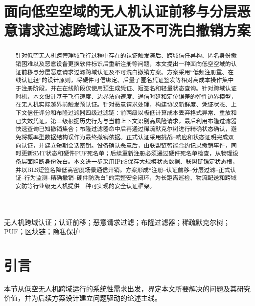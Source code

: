 \documentclass[conference]{IEEEtran}
\begin{document}
	
	\title{面向低空空域的无人机认证前移与分层恶意请求过滤跨域认证及不可洗白撤销方案}
	
	\author{
	}
	
	\maketitle
	
	\begin{abstract}
		针对低空无人机跨管理域飞行过程中存在的认证触发滞后、跨域信任异构、匿名身份撤销困难以及恶意设备更换软件标识后重新注册等问题，本文提出一种面向低空空域的认证前移与分层恶意请求过滤跨域认证及不可洗白撤销方案。方案采用“低频注册重、在线认证轻”的设计原则，将硬件可信绑定、后量子匿名凭证签发等相对高成本操作集中于注册阶段，并在在线阶段仅使用预生成凭证、短签名和轻量状态查询。针对跨域认证时机，本文设计基于飞行速度、边界法向速度、通信时延和定位误差的弹性边界模型，在无人机实际越界前触发预认证。针对恶意请求处理，构建协议新鲜度、凭证状态、上下文信任评分和布隆过滤器四级过滤链：前两级以极低计算成本丢弃格式异常、重放和已失效凭证，第三级根据历史行为与当前上下文识别高风险请求，最后利用布隆过滤器快速查询已知撤销集合；布隆过滤器命中后再通过稀疏默克尔树进行精确状态确认，避免将概率型数据结构误作为最终撤销依据。正式认证采用挑战--响应和状态证明完成双向认证，并建立短期会话密钥。设备确认恶意后，由联盟链智能合约记录撤销事件，同时更新SMT状态和硬件PUF死名单；后续重新注册必须通过硬件死名单检查，从物理设备层面阻断身份洗白。本文进一步采用IPFS保存大规模状态数据、联盟链锚定状态根，并以BLS短签名降低高密度场景通信开销。方案形成“注册--认证前移--分层过滤--正式认证--行为监测--精确撤销--硬件防洗白”的完整安全闭环，为长距离巡检、物流配送和跨域安防等行业级无人机提供一种可实现的安全认证框架。
	\end{abstract}
	
	\begin{IEEEkeywords}
		无人机跨域认证；认证前移；恶意请求过滤；布隆过滤器；稀疏默克尔树；PUF；区块链；隐私保护
	\end{IEEEkeywords}
	
	\section{引言}
	
	本节从低空无人机跨域运行的系统性需求出发，界定本文所要解决的问题及其研究价值，并为后续方案设计建立问题驱动的论述主线。
	
\end{document}
